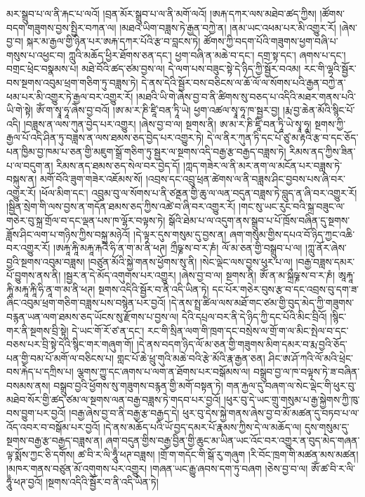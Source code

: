 མར་སྒྲུབ་པ་ལ་ནི་རྐང་པ་ལའོ། །བྲན་མོར་སྒྲུབ་པ་ལ་ནི་མགོ་ལའོ། །ཨརྐ་དཀར་ལས་མཐེབ་ཚད་ཀྱིས། །ཚོགས་བདག་གཟུགས་བྱས་སྤྱིར་བཀན་ལ། །མཐའ་ཡིག་བཟླས་ཏེ་རྒྱན་བཀྱེ་ན། །ནམ་ཡང་འཕམ་པར་མི་འགྱུར་རོ། །ཞེས་བྱ་བ། སྐར་མ་རྒྱལ་གྱི་ཉིན་པར་ཨརྐ་དཀར་པོའི་རྩ་བ་བླངས་ཏེ། ཚོགས་ཀྱི་བདག་པོའི་གཟུགས་ཕྱག་བཞི་པ་གསུས་པ་འཕྱང་བ། ཀླུའི་མཆོད་ཕྱིར་ཐོགས་ཅན་དང་། ཕྱག་བཞི་ན་མཆེ་བ་དང་། དགྲ་སྟ་དང་། ཞགས་པ་དང་། བགྲང་ཕྲེང་བསྣམས་པ། མཐེ་བོའི་ཚད་ཙམ་བྱས་ལ། དེ་ལག་པས་བཟུང་སྟེ་དེ་ཉིད་ཀྱི་སྦྱོར་བའམ། རང་གི་ལྷའི་སྦྱོར་བས་སྔགས་འབུམ་ཕྲག་གཅིག་ཏུ་བཟླས་ཏེ། དེ་ནས་དེའི་སྦྱོར་བས་བཅིངས་ལ་ཆོ་ལོ་ལ་སོགས་པའི་རྒྱན་བཀྱེ་ན་ཕམ་པར་མི་འགྱུར་ཏེ་རྒྱལ་བར་འགྱུར་རོ། །མཐའི་ཡི་གེ་ཞེས་བྱ་བ་ནི་ཚིགས་སུ་བཅད་པ་འདིའི་མཐར་གནས་པའི་ཡི་གེ་སྟེ། ཨོཾ་ག་སྭཱ་ཧཱ་ཞེས་བྱ་བའོ། །ཨ་མ་ར་ཎི་ཛཱི་བན་ཏཱི་ཡེ། ཕྱག་འཚལ་སྭཱ་ཧཱ་ཁ་སྦྱར་བྱ། །རྨ་བྱ་ཆེན་མོའི་སྙིང་པོ་འདི། །བཟླས་ན་ལས་ཀུན་བྱེད་པར་འགྱུར། །ཞེས་བྱ་བ་ལ། སྔགས་ནི། ཨ་མ་ར་ཎི་ཛཱི་བན་ཏཱི་ཡེ་སྭཱ་ཧཱ། སྔགས་ཀྱི་རྒྱལ་པོ་འདི་ཤིན་ཏུ་བཟླས་ན་ལས་ཐམས་ཅད་བྱེད་པར་འགྱུར་ཏེ། དེ་ལ་ནིར་ཀུན་ཏི་དང་པོ་ཙུ་མ་རྟའི་རྩ་བ་དང་ཅོད་པན་ཁྱིམ་བྱ་ཁམ་པ་ཅན་གྱི་མཇུག་སྒྲོ་གཅིག་ཏུ་སྦྱར་ལ་སྔགས་འདི་བརྒྱ་རྩ་བརྒྱད་བཟླས་ཏེ། རིམས་ནད་ཀྱིས་ཟིན་པ་ལ་བདུག་ན། རིམས་ནད་ཐམས་ཅད་སེལ་བར་བྱེད་དོ། །ཀླད་གཟེར་ལ་ནི་མར་ནག་ལ་མངོན་པར་བཟླས་ཏེ་བསྐུས་ན། མགོ་བོའི་ཟུག་གཟེར་འཇོམས་སོ། །འབྲས་དང་འབྲུ་ཕྲན་ཚེགས་ལ་ནི་བཟླས་ཤིང་བྱབས་པས་ཞི་བར་འགྱུར་རོ། །ཕོལ་མིག་དང་། འབྲུམ་བུ་ལ་སོགས་པ་ནི་ཙནྡན་གྱི་ཆུ་ལ་ལན་བདུན་བཟླས་ཏེ་བླུད་ན་ཞི་བར་འགྱུར་རོ། །སྦྱིན་སྲེག་གི་ལས་བྱས་ན་གདོན་ཐམས་ཅད་ཀྱིས་འཚེ་བ་ཞི་བར་འགྱུར་རོ། །གང་སུ་ཡང་རུང་བའི་སྐྲ་བཟུང་ལ་གཅེར་བུ་སྐྲ་གྲོལ་བ་དང་ལྡན་པས་ཁ་ལྷོར་བལྟས་ཏེ། སྒོའི་ཐེམ་པ་ལ་འདུག་ནས་སྒྲུབ་པ་པོ་ཁྲོས་བཞིན་དུ་སྔགས་ཟློས་ཤིང་ལག་པ་གཉིས་ཀྱིས་བསྐུ་མཉེའོ། །དེ་ལྟར་དུས་གསུམ་དུ་བྱས་ན། ཞག་གསུམ་གྱིས་དཔའ་བོ་ཉིད་ཀྱང་འཆི་བར་འགྱུར་རོ། །ཨརྐཱ་རྐཱི་མརྐཱ་རྐའི་ཧི་ན་ག་མ་ནི་ཕཊ། ཀྲྀཥྞ་ས་བ་ར་ཎཾ། ལོ་མ་ཅན་གྱི་བསྒྲུབ་པ་ལ། །ཀླུ་ནོར་ཞེས་བྱའི་སྔགས་འབུམ་བཟླས། །བཙུན་མོའི་སྐྱེ་གནས་ཕྱོགས་སུ་ནི། །སེང་ལྡེང་ལས་བྱས་ཕུར་པ་ལ། །བརྒྱ་བཟླས་དམར་པོ་བྱུགས་ནས་ནི། །སྦྱར་ན་དེ་མོད་འགུགས་པར་འགྱུར། །ཞེས་བྱ་བ་ལ། སྔགས་ནི། ཨོཾ་ན་མ་སྐྲྀཥྞ་ས་བ་ར་ཎཾ། ཨཱརྐཱ་རྐཱི་མརྐཱ་རྐཱི་ཧི་ནཱ་ག་མ་ནི་ཕཊ། སྔགས་འདིའི་སྦྱོར་བ་ནི་འདི་ཡིན་ཏེ། དང་པོར་གཅེར་བུས་རྩ་བ་དང་འབྲས་བུ་དག་ཟ་ཞིང་འབུམ་ཕྲག་གཅིག་བཟླས་པས་བསྙེན་པར་བྱའོ། །དེ་ནས་སྤྲ་ཚིལ་ལས་མཐོ་གང་ཙམ་གྱི་བུད་མེད་ཀྱི་གཟུགས་བརྙན་ཡན་ལག་ཐམས་ཅད་ཡོངས་སུ་རྫོགས་པ་བྱས་ལ། དེའི་དཔྲལ་བར་ནི་དེ་ཉིད་ཀྱི་དང་པོའི་མིང་བྲིའོ། །སྙིང་གར་ནི་སྔགས་བྲི་སྟེ། དེ་ཡང་གོ་རོ་ཙ་ན་དང་། རང་གི་སྲིན་ལག་གི་ཁྲག་དང་བསྲེས་ལ་གྲོ་ག་ལ་མིང་སྤེལ་བ་དང་བཅས་པར་བྲི་སྟེ་དེའི་སྙིང་གར་གཞུག་གོ། །དེ་ནས་བདག་ཉིད་ལོ་མ་ཅན་གྱི་གཟུགས་མིག་དམར་བ་རྨ་བྱའི་ཅོད་པན་གྱི་བམ་པོ་མགོ་ལ་བཅིངས་པ། གླང་པོ་ཆེ་ཕྲུ་གུའི་མཆེ་བའི་རྩེ་མོའི་རྣ་རྒྱན་ཅན། ཤིང་ཨ་ཤོ་ཀའི་ལོ་མའི་ཕྲེང་བས་རྐེད་པ་དཀྲིས་པ། ལྕགས་ཀྱུ་དང་ཞགས་པ་ལག་ན་ཐོགས་པར་བསྒོམས་ལ། བསྒྲུབ་བྱ་ལ་ཁ་བལྟས་ཏེ་ཟ་བཞིན་བསམས་ནས། བསྒྲུབ་བྱའི་ཕྱོགས་སུ་གཟུགས་བརྙན་གྱི་མགོ་བསྟན་ཏེ། གན་རྐྱལ་དུ་བཞག་ལ་སེང་ལྡེང་གི་ཕུར་བུ་མཐེབ་སོར་གྱི་ཚད་ཙམ་ལ་སྔགས་ལན་བརྒྱ་བཟླས་ཏེ་གདབ་པར་བྱའོ། །ཕུར་བུ་དེ་ཡང་གྲུ་གསུམ་པ་རྒྱ་སྐྱེགས་ཀྱི་ཁུ་བས་བྱུག་པར་བྱའོ། །བརྒྱ་ཞེས་བྱ་བ་ནི་བརྒྱ་རྩ་བརྒྱད་དེ། ཕུར་བུ་དེས་སྐྱེ་གནས་ཞེས་བྱ་བ་མོ་མཚན་དུ་བཏབ་པ་ལ་འོད་འབར་བ་བསྒོམ་པར་བྱའོ། །དེ་ནས་མཆོད་པའི་ཡོ་བྱད་དམར་པོ་རྣམས་ཀྱིས་དེ་ལ་མཆོད་ལ། དུས་གསུམ་དུ་སྔགས་བརྒྱ་རྩ་བརྒྱད་བཟླས་ན། ཞག་བདུན་གྱིས་བརྒྱ་བྱིན་གྱི་ཆུང་མ་ཡིན་ཡང་འོང་བར་འགྱུར་ན་བུད་མེད་གཞན་ལྟ་སྨོས་ཀྱང་ཅི་དགོས། ཚ་བི་ར་ལི་ཧཱུྃ་ཕཊ་བཟླས། །གྲོ་ག་གདོང་གི་སྒོ་རུ་གཞུག །རི་བོང་ཁྲག་གི་མཚན་མས་མཚན། །མཁར་གནས་བཙུན་མོ་འགུགས་པར་འགྱུར། །གཞན་ཡང་རྒྱུ་ཞབས་དག་ཏུ་བཞག །ཅེས་བྱ་བ་ལ། ཨོཾ་ཚ་བི་ར་ལི་ཧཱུྃ་ཕཊ་བྱའོ། །སྔགས་འདིའི་སྦྱོར་བ་ནི་འདི་ཡིན་ཏེ། 